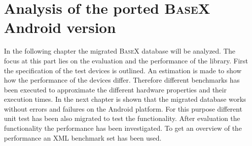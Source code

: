\chapter{Analysis of the ported \textsc{BaseX} Android version}
\label{cha:analysis}
In the following chapter the migrated \textsc{BaseX} database will be analyzed.
The focus at this part lies on the evaluation and the performance of the library.
First the specification of the test devices is outlined.
An estimation is made to show how the performance of the devices differ.
Therefore different benchmarks has been executed to approximate the different hardware properties and their execution times.
In the next chapter is shown that the migrated database works without errors and failures on the Android platform.
For this purpose different unit test has been also migrated to test the functionality.
After evaluation the functionality the performance has been investigated.
To get an overview of the performance an XML benchmark set has been used.
